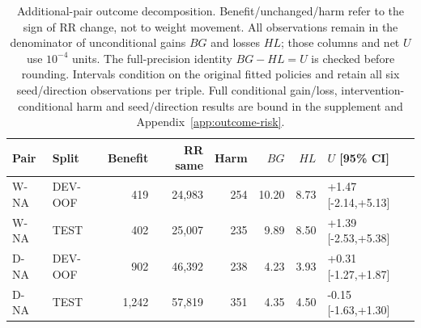 \begin{table}[htbp]
\centering\footnotesize\setlength{\tabcolsep}{3pt}
\caption{Additional-pair outcome decomposition. Benefit/unchanged/harm refer to the sign of RR change, not to weight movement. All observations remain in the denominator of unconditional gains $BG$ and losses $HL$; those columns and net $U$ use $10^{-4}$ units. The full-precision identity $BG-HL=U$ is checked before rounding. Intervals condition on the original fitted policies and retain all six seed/direction observations per triple. Full conditional gain/loss, intervention-conditional harm and seed/direction results are bound in the supplement and Appendix~\ref{app:outcome-risk}.}
\label{tab:scope-outcomes}
\begin{tabular}{llrrrrrl}
\toprule
Pair & Split & Benefit & RR same & Harm & $BG$ & $HL$ & $U$ [95\% CI]\\
\midrule
W-NA & DEV-OOF & 419 & 24,983 & 254 & 10.20 & 8.73 & +1.47 [-2.14,+5.13]\\
W-NA & TEST & 402 & 25,007 & 235 & 9.89 & 8.50 & +1.39 [-2.53,+5.38]\\
D-NA & DEV-OOF & 902 & 46,392 & 238 & 4.23 & 3.93 & +0.31 [-1.27,+1.87]\\
D-NA & TEST & 1,242 & 57,819 & 351 & 4.35 & 4.50 & -0.15 [-1.63,+1.30]\\
\bottomrule
\end{tabular}
\end{table}
